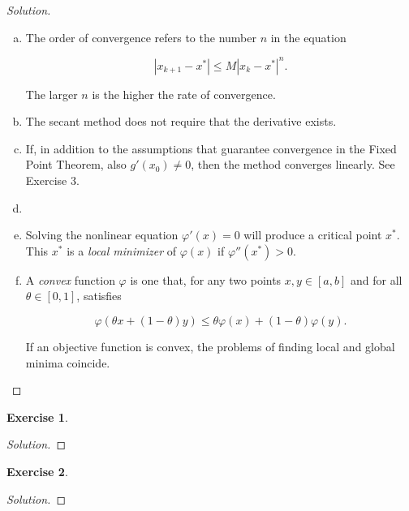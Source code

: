 \documentclass[12pt,a4]{article}
\theoremstyle{definition}
\newtheorem{exercise}{Exercise}
\begin{document}
\begin{proof}[Solution]
\begin{enumerate}[(a)]
		\item The order of convergence refers to the number $n$ in the equation
		
		\[
		|x_{k + 1} - x^*| \leq M |x_k - x^*|^n {.}
		\]
		
		\noindent The larger $n$ is the higher the rate of convergence.
		
		\item The secant method does not require that the derivative exists. 
		
		\item If, in addition to the assumptions that guarantee convergence in the Fixed Point Theorem, also $g'(x_0) \neq 0$, then the method converges linearly. See Exercise 3. 
		
		\item 
		
		\item Solving the nonlinear equation $\varphi'(x) = 0$ will produce a critical point $x^*$. This $x^*$ is a \emph{local minimizer} of $\varphi(x)$ if $\varphi''(x^*) > 0$.
		
		\item A \emph{convex} function $\varphi$ is one that, for any two points $x, y \in [a, b]$ and for all $\theta \in [0, 1]$, satisfies
		
		\[
		\varphi(\theta x + (1 - \theta) y) \leq \theta \varphi(x) + (1 - \theta) \varphi(y) {.}
		\]
		
		\noindent If an objective function is convex, the problems of finding local and global minima coincide. 
	\end{enumerate}
\end{proof}

\begin{exercise}
	 
\end{exercise}
\begin{proof}[Solution]
	
\end{proof}

\begin{exercise}
	
\end{exercise}
\begin{proof}[Solution]
	
\end{proof}
\end{document}
